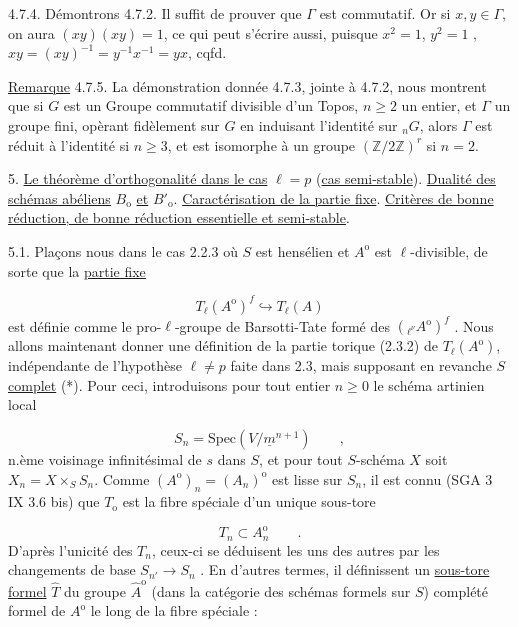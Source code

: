 4.7.4. Démontrons 4.7.2. Il suffit de prouver que $\Gamma$ est commutatif. Or si $x, y \in \Gamma$, on aura $(xy)(xy) = 1$, ce qui peut s'écrire aussi, puisque $x^2 = 1$, $y^2 = 1$ , $xy = (xy)^{-1} = y^{-1}x^{-1} = yx$, cqfd.

\underline{Remarque} 4.7.5. La démonstration donnée 4.7.3, jointe à 4.7.2, nous montrent que si $G$ est un Groupe commutatif divisible d'un Topos, $n \geq 2$ un entier, et $\Gamma$ un groupe fini, opèrant fidèlement sur $G$ en induisant l'identité sur ${}_nG$, alors $\Gamma$ est réduit à l'identité si $n \geq 3$, et est isomorphe à un groupe $(\mathbb{Z}/2\mathbb{Z})^r$ si $n=2$.




5. \underline{Le théorème d'orthogonalité dans le cas} $\ell = p$ (\underline{cas semi-stable}). \underline{Dualité des schémas abéliens} $B_{\mathrm{o}}$ \underline{et} $B'_{\mathrm{o}}$. \underline{Caractérisation de la partie fixe}. \underline{Critères de bonne réduction, de bonne réduction essentielle et semi-stable}.

5.1. Plaçons nous dans le cas 2.2.3 où $S$ est hensélien et $A^{\mathrm{o}}$ est $\ell$-divisible, de sorte que la \underline{partie fixe}

\begin{equation*}
T_\ell(A^{\mathrm{o}})^f \hookrightarrow T_\ell(A)
\end{equation*}
est définie comme le pro-$\ell$-groupe de Barsotti-Tate formé des $({}_{\ell^\nu}A^{\mathrm{o}})^f$ . Nous allons maintenant donner une définition de la partie torique (2.3.2) de $T_\ell(A^{\mathrm{o}})$, indépendante de l'hypothèse $\ell \neq p$ faite dans 2.3, mais supposant en revanche $S$ \underline{complet} (*). Pour ceci, introduisons pour tout entier $n \geq 0$ le schéma artinien local

\begin{equation}\tag{5.1.1}
S_n = \mathrm{Spec}(V/\underline{m}^{n+1}) \qquad ,
\end{equation}
n.ème voisinage infinitésimal de $s$ dans $S$, et pour tout $S$-schéma $X$ soit $X_n = X\times_S S_n$. Comme $(A^{\mathrm{o}})_n = (A_n)^{\mathrm{o}}$ est lisse sur $S_n$, il est connu (SGA 3 IX 3.6 bis) que $T_{\mathrm{o}}$ est la fibre spéciale d'un unique sous-tore

\begin{equation}\tag{5.1.2}
T_n \subset A_n^{\mathrm{o}} \qquad .
\end{equation}
D'après l'unicité des $T_n$, ceux-ci se déduisent les uns des autres par les changements de base $S_{n'} \longrightarrow S_n$ . En d'autres termes, il définissent un \underline{sous-tore formel} $\hat{T}$ du groupe $\hat{A}^{\mathrm{o}}$ (dans la catégorie des schémas formels sur $S$) complété formel de $A^{\mathrm{o}}$ le long de la fibre spéciale :

